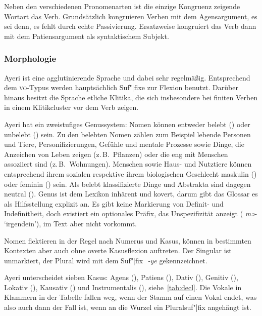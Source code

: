 \documentclass[
	12pt,
	ngerman,
]{scrartcl}
\newcommand{\zwsp}{\mbox{​}} %
\newcommand{\rayr}[2]{\zwsp\smash{{\Tagati #1}} \emph{#2}} %
\newcommand{\xayr}[3]{\zwsp\smash{\Tagati #1} \emph{#2} `#3'} %
\begin{document}
Neben den verschiedenen Pronomenarten ist die einzige Kongruenz zeigende
Wortart das Verb. Grundsätzlich kongruieren Verben mit dem Agensargument, es
sei denn, es fehlt durch echte Passivierung. Ersatzweise kongruiert das Verb
dann mit dem Patiensargument als syntaktischem Subjekt.

\subsubsection{Morphologie}

Ayeri ist eine agglutinierende Sprache und dabei sehr regelmäßig. Entsprechend
dem \textsc{vo}-Typus werden hauptsächlich Suf"|fixe zur Flexion benutzt.
Darüber hinaus besitzt die Sprache etliche Klitika, die sich insbesondere bei
finiten Verben in einem Klitikcluster vor dem Verb zeigen.

\label{subsubsec:nom}

Ayeri hat ein zweistufiges Genussystem: Nomen können entweder belebt (\Anim)
oder unbelebt (\Inan) sein. Zu den belebten Nomen zählen zum Beispiel lebende
Personen und Tiere, Personifizierungen, Gefühle und mentale Prozesse sowie
Dinge, die Anzeichen von Leben zeigen (z.\,B.~Pflanzen) oder die eng mit
Menschen assoziiert sind (z.\,B.~Wohnungen). Menschen sowie Haus- und Nutztiere
können entsprechend ihrem sozialen respektive ihrem biologischen Geschlecht
maskulin (\M) oder feminin (\F) sein. Als belebt klassifizierte Dinge und
Abstrakta sind dagegen neutral (\N). Genus ist dem Lexikon inhärent und kovert,
darum gibt das Glossar es als Hilfsstellung explizit an. Es gibt keine
Markierung von Definit- und Indefinitheit, doch existiert ein optionales Präfix,
das Unspezifizität anzeigt (\xayr{me/}{mə-}{irgendein}), im Text aber nicht
vorkommt.

Nomen flektieren in der Regel nach Numerus und Kasus, können in bestimmten
Kontexten aber auch ohne overte Kasusflexion auftreten. Der Singular ist
unmarkiert, der Plural wird mit dem Suf"|fix \rayr{/ye}{-ye} gekennzeichnet.

Ayeri unterscheidet sieben Kasus: Agens (\Aarg), Patiens (\Parg), Dativ (\Dat),
Genitiv (\Gen), Lokativ (\Loc), Kausativ (\Caus) und Instrumentalis (\Ins),
siehe~\cref{tab:decl}. Die Vokale in Klammern in der Tabelle fallen weg, wenn
der Stamm auf einen Vokal endet, was also auch dann der Fall ist, wenn an die
Wurzel ein Pluralsuf"|fix angehängt ist.
\end{document}
